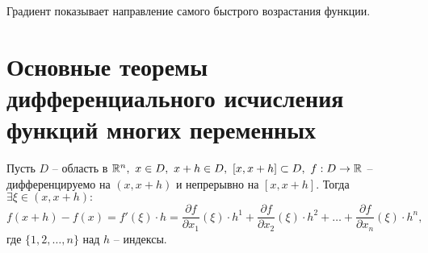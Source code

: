 \begin{note}
    Градиент показывает направление самого быстрого возрастания функции.
\end{note}

\newpage

\section{Основные теоремы дифференциального исчисления функций многих переменных}

\begin{theorem}[О среднем]
    Пусть $ D $ -- область в $ \R^n, \ x \in D, \ x + h \in D, \ [x, x+h]\subset D, \ f: D \rightarrow\R $ -- дифференцируемо на $ (x,x+h) $ и непрерывно на $ [x,x+h] $. Тогда $ \exists \xi \in (x,x+h): $
    \[
        f(x+h)-f(x) = f'(\xi)\cdot h = \frac{\partial f}{\partial x_1}(\xi)\cdot h^1 + \frac{\partial f}{\partial x_2}(\xi)\cdot h^2 + \ldots + \frac{\partial f}{\partial x_n}(\xi)\cdot h^n,
    \] где $ \{1,2,\ldots,n\} $ над $ h $ -- индексы.
\end{theorem}

